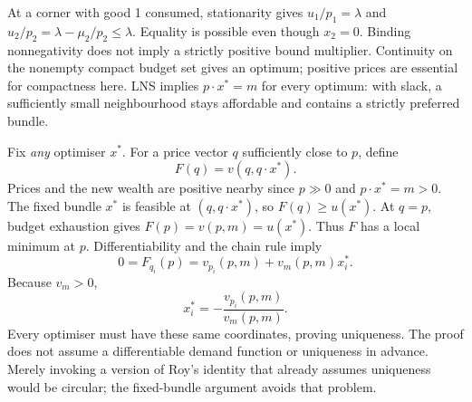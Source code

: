 At a corner with good 1 consumed, stationarity gives $u_1/p_1=\lambda$ and $u_2/p_2=\lambda-\mu_2/p_2\le\lambda$. Equality is possible even though $x_2=0$. Binding nonnegativity does not imply a strictly positive bound multiplier.
\clearpage
{}
Continuity on the nonempty compact budget set gives an optimum; positive prices are essential for compactness here. LNS implies $p\cdot x^*=m$ for every optimum: with slack, a sufficiently small neighbourhood stays affordable and contains a strictly preferred bundle.

Fix \emph{any} optimiser $x^*$. For a price vector $q$ sufficiently close to $p$, define
\[
 F(q)=v(q,q\cdot x^*).
\]
Prices and the new wealth are positive nearby since $p\gg0$ and $p\cdot x^*=m>0$. The fixed bundle $x^*$ is feasible at $(q,q\cdot x^*)$, so $F(q)\ge u(x^*)$. At $q=p$, budget exhaustion gives $F(p)=v(p,m)=u(x^*)$. Thus $F$ has a local minimum at $p$. Differentiability and the chain rule imply
\[
 0=F_{q_i}(p)=v_{p_i}(p,m)+v_m(p,m)x_i^*.
\]
Because $v_m>0$,
\[
 x_i^*=-\frac{v_{p_i}(p,m)}{v_m(p,m)}.
\]
Every optimiser must have these same coordinates, proving uniqueness. The proof does not assume a differentiable demand function or uniqueness in advance. Merely invoking a version of Roy's identity that already assumes uniqueness would be circular; the fixed-bundle argument avoids that problem.

